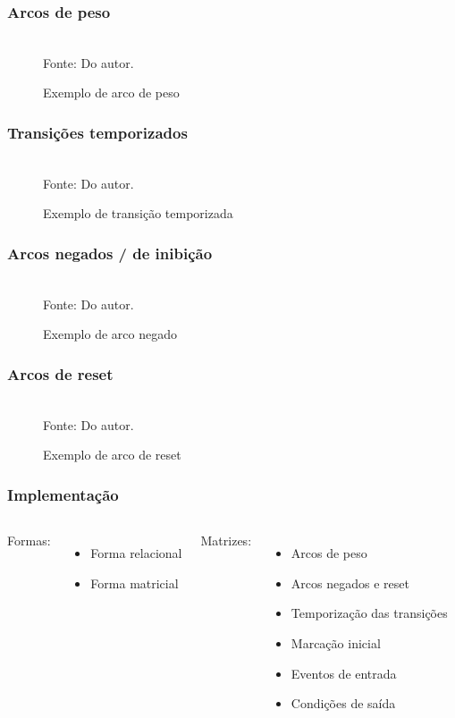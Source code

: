 \documentclass{beamer}
\newcommand{\incsvg}[2]{%
	\def\svgwidth{\columnwidth}
	\graphicspath{{#1}}
	
}
\begin{document}
\begin{frame}
\frametitle{Arcos de peso}
	\begin{figure}[ht]
		\centering
		\caption{Exemplo de arco de peso}
		\incsvg{images}{images/samplepetri}\\
		\label{fig:sampepetri}
		\footnotesize{Fonte: Do autor.}
	\end{figure}
\end{frame}

\begin{frame}
\frametitle{Transições temporizados}
\begin{figure}[ht]
	\centering
	\caption{Exemplo de transição temporizada}
	\incsvg{images}{images/petritime}\\
		\label{fig:sampepetri}
		\footnotesize{Fonte: Do autor.}
	\end{figure}
\end{frame}

\begin{frame}
\frametitle{Arcos negados / de inibição}
\begin{figure}[ht]
	\centering
		\caption{Exemplo de arco negado}
		\incsvg{images}{images/negado}\\
		\label{fig:sampepetri}
		\footnotesize{Fonte: Do autor.}
	\end{figure}
\end{frame}

\begin{frame}
\frametitle{Arcos de reset}
\begin{figure}[ht]
	\centering
	\caption{Exemplo de arco de reset}
	\incsvg{images}{images/reset}\\
	\label{fig:sampepetri}
	\footnotesize{Fonte: Do autor.}
\end{figure}
\end{frame}

\begin{frame}
\frametitle{Implementação}
\begin{columns}
	Formas:
	\begin{itemize}
		\item Forma relacional
		\item Forma matricial
	\end{itemize}
	Matrizes:
	\begin{itemize}
		\item Arcos de peso
		\item Arcos negados e reset
		\item Temporização das transições
		\item Marcação inicial
		\item Eventos de entrada
		\item Condições de saída
	\end{itemize}
\end{columns}
\end{frame}
\end{document}
